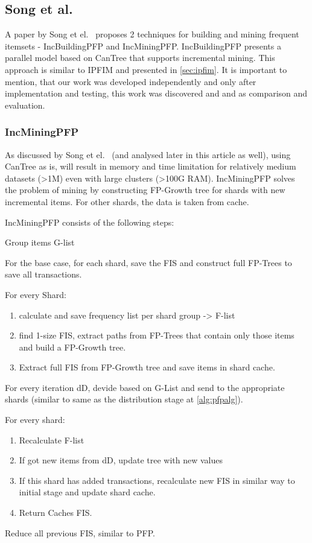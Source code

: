 \subsection{Song et al. }
\label{sec:song}
A paper by Song et el.~\cite{song2017} proposes 2 techniques for building and mining frequent itemsets - IncBuildingPFP and IncMiningPFP. IncBuildingPFP presents a parallel model based on CanTree that supports incremental mining. This approach is similar to IPFIM and presented in \autoref{sec:ipfim}.  It is important to mention, that our work was developed independently and only after implementation and testing, this work was discovered and and as comparison and evaluation.


\subsubsection{IncMiningPFP}
\label{subsec:IncMiningPFP}
As discussed by Song et el.~\cite{song2017} (and analysed later in this article as well), using CanTree as is, will result in memory and time limitation for relatively medium datasets (>1M) even with large clusters (>100G RAM).  IncMiningPFP solves the problem of mining by constructing FP-Growth tree for shards with new incremental items. For other shards, the data is taken from cache.

IncMiningPFP consists of the following steps:
\begin{steps}
	\item Group items G-list
	\item For the base case, for each shard, save the FIS and construct full FP-Trees to save all transactions. 
	\item For every Shard:
			\begin{enumerate}
			\item calculate and save frequency list per shard group -> F-list
			\item find 1-size FIS, extract paths from FP-Trees that contain only those items and build a FP-Growth tree.
			\item Extract full FIS from FP-Growth tree and save items in shard cache.
			\end{enumerate}
	\item For every iteration dD, devide based on G-List and send to the appropriate shards (similar to same as the distribution  stage at \autoref{alg:pfpalg}).
	\item For every shard: 
				\begin{enumerate}
				\item Recalculate F-list
				\item If got new items from dD, update tree with new values
				\item If this shard has added transactions, recalculate new FIS in similar way to initial stage and update shard cache. 
				\item Return Caches FIS.
				\end{enumerate}
	\item Reduce all previous FIS, similar to PFP.
\end{steps}

